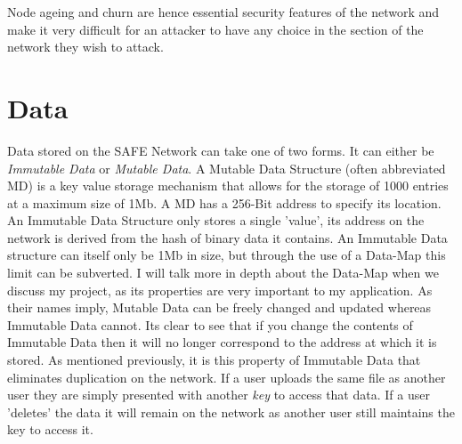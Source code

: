 Node ageing and churn are hence essential security features of the network and make it very difficult for an attacker to have any choice in the section of the network they wish to attack.

\section{Data}

Data stored on the SAFE Network can take one of two forms. It can either be \textit{Immutable Data} or \textit{Mutable Data}. A Mutable Data Structure (often abbreviated MD) is a key value storage mechanism that allows for the storage of 1000 entries at a maximum size of 1Mb. A MD has a 256-Bit address to specify its location. An Immutable Data Structure only stores a single 'value', its address on the network is derived from the hash of binary data it contains. An Immutable Data structure can itself only be 1Mb in size, but through the use of a Data-Map this limit can be subverted. I will talk more in depth about the Data-Map when we discuss my project, as its properties are very important to my application. As their names imply, Mutable Data can be freely changed and updated whereas Immutable Data cannot. Its clear to see that if you change the contents of Immutable Data then it will no longer correspond to the address at which it is stored. As mentioned previously, it is this property of Immutable Data that eliminates duplication on the network. If a user uploads the same file as another user they are simply presented with another \textit{key} to access that data. If a user 'deletes' the data it will remain on the network as another user still maintains the key to access it.
